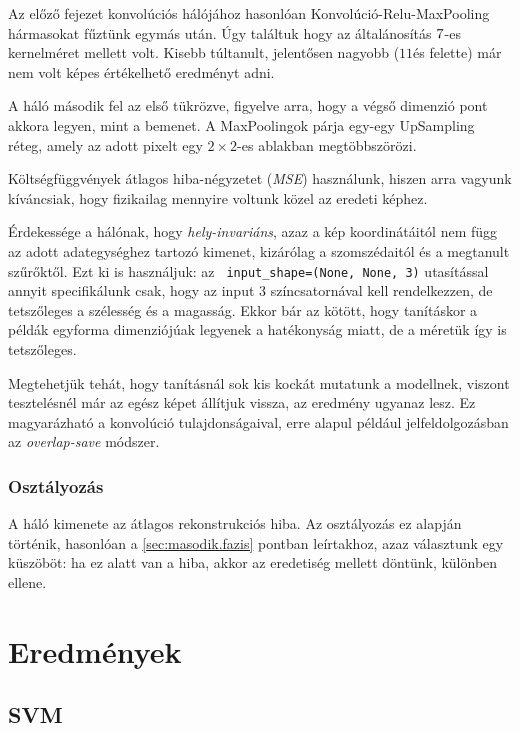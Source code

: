Az előző fejezet konvolúciós hálójához hasonlóan Konvolúció-Relu-MaxPooling hármasokat
fűztünk egymás után. Úgy találtuk hogy az általánosítás $ 7 \time 7 $-es kernelméret 
mellett volt. Kisebb túltanult, jelentősen nagyobb ($ 11  $és felette) már nem volt 
képes értékelhető eredményt adni.

A háló második fel az első tükrözve, figyelve arra, hogy a végső dimenzió pont akkora 
legyen, mint a bemenet. A MaxPoolingok párja egy-egy UpSampling réteg, amely az adott
pixelt egy $ 2 \times 2 $-es ablakban megtöbbszörözi.

Költségfüggvények átlagos hiba-négyzetet (\textit{MSE}) használunk, hiszen arra vagyunk 
kíváncsiak, hogy fizikailag mennyire voltunk közel az eredeti képhez.


Érdekessége a hálónak, hogy \textit{hely-invariáns}, azaz a kép koordinátáitól nem függ az adott
adategységhez tartozó kimenet, kizárólag a szomszédaitól és a megtanult szűrőktől.
Ezt ki is használjuk: az \texttt{ input\_shape=(None, None, 3)} utasítással annyit
specifikálunk csak, hogy az input 3 színcsatornával kell rendelkezzen, de tetszőleges
a szélesség és a magasság. Ekkor bár az kötött, hogy tanításkor a példák egyforma 
dimenziójúak legyenek a hatékonyság miatt, de a méretük így is tetszőleges.


Megtehetjük tehát, hogy tanításnál sok kis kockát mutatunk a modellnek, viszont tesztelésnél
már az egész képet állítjuk vissza, az eredmény ugyanaz lesz. Ez magyarázható a konvolúció 
tulajdonságaival, erre alapul például jelfeldolgozásban az \textit{overlap-save} módszer.



\subsubsection{Osztályozás}

A háló kimenete az átlagos rekonstrukciós hiba. Az osztályozás ez alapján történik,
hasonlóan a \ref{sec:masodik.fazis} pontban leírtakhoz, azaz választunk egy küszöböt:
ha ez alatt van a hiba, akkor az eredetiség mellett döntünk, különben ellene.



\newpage
\section{Eredmények}

\subsection{SVM}

